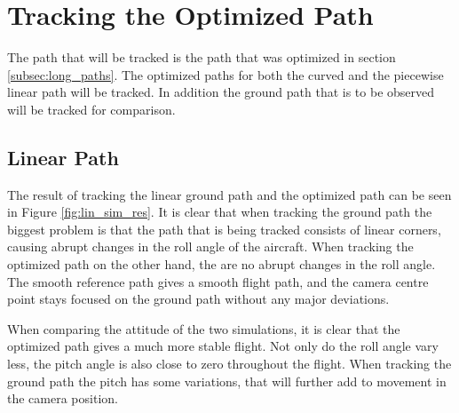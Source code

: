 \section{Tracking the Optimized Path}

The path that will be tracked is the path that was optimized in section \ref{subsec:long_paths}. The optimized paths for both the curved and the piecewise linear path will be tracked. In addition the ground path that is to be observed will be tracked for comparison.


\subsection{Linear Path}

The result of tracking the linear ground path and the optimized path can be seen in Figure \ref{fig:lin_sim_res}. It is clear that when tracking the ground path the biggest problem is that the path that is being tracked consists of linear corners, causing abrupt changes in the roll angle of the aircraft. When tracking the optimized path on the other hand, the are no abrupt changes in the roll angle. The smooth reference path gives a smooth flight path, and the camera centre point stays focused on the ground path without any major deviations.

When comparing the attitude of the two simulations, it is clear that the optimized path gives a much more stable flight. Not only do the roll angle vary less, the pitch angle is also close to zero throughout the flight. When tracking the ground path the pitch has some variations, that will further add to movement in the camera position. 

